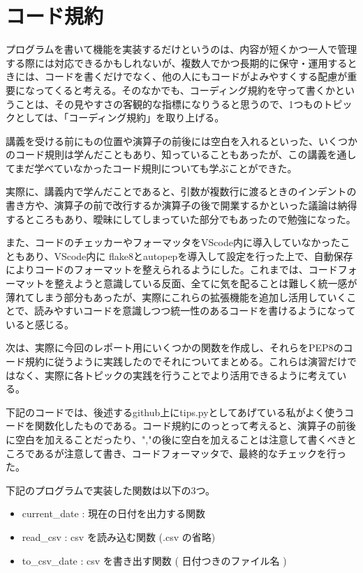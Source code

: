 \documentclass[12pt]{jsarticle}
\begin{document}
\section{コード規約}
プログラムを書いて機能を実装するだけというのは、内容が短くかつ一人で管理する際には対応できるかもしれないが、複数人でかつ長期的に保守・運用するときには、コードを書くだけでなく、他の人にもコードがよみやすくする配慮が重要になってくると考える。そのなかでも、コーディング規約を守って書くかということは、その見やすさの客観的な指標になりうると思うので、1つものトピックとしては、「コーディング規約」を取り上げる。

講義を受ける前にも{}の位置や演算子の前後には空白を入れるといった、いくつかのコード規則は学んだこともあり、知っていることもあったが、この講義を通してまだ学べていなかったコード規則についても学ぶことができた。

実際に、講義内で学んだことであると、引数が複数行に渡るときのインデントの書き方や、演算子の前で改行するか演算子の後で開業するかといった議論は納得するところもあり、曖昧にしてしまっていた部分でもあったので勉強になった。

また、コードのチェッカーやフォーマッタをVScode内に導入していなかったこともあり、VScode内に flake8とautopepを導入して設定を行った上で、自動保存によりコードのフォーマットを整えられるようにした。これまでは、コードフォーマットを整えようと意識している反面、全てに気を配ることは難しく統一感が薄れてしまう部分もあったが、実際にこれらの拡張機能を追加し活用していくことで、読みやすいコードを意識しつつ統一性のあるコードを書けるようになっていると感じる。

次は、実際に今回のレポート用にいくつかの関数を作成し、それらをPEP8のコード規約に従うように実践したのでそれについてまとめる。これらは演習だけではなく、実際に各トピックの実践を行うことでより活用できるように考えている。

下記のコードでは、後述するgithub上にtips.pyとしてあげている私がよく使うコードを関数化したものである。コード規約にのっとって考えると、演算子の前後に空白を加えることだったり、","の後に空白を加えることは注意して書くべきところであるが注意して書き、コードフォーマッタで、最終的なチェックを行った。

下記のプログラムで実装した関数は以下の3つ。
\begin{itemize}
  \item current\_date : 現在の日付を出力する関数
  \item read\_csv     : csv を読み込む関数 (.csv の省略)
  \item to\_csv\_date  : csv を書き出す関数 ( 日付つきのファイル名 )
\end{itemize}
\end{document}
